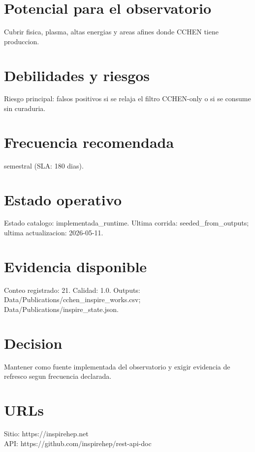 \documentclass[10pt,a4paper]{article}
\begin{document}
\section*{Potencial para el observatorio}
Cubrir fisica, plasma, altas energias y areas afines donde CCHEN tiene produccion.

\section*{Debilidades y riesgos}
Riesgo principal: falsos positivos si se relaja el filtro CCHEN-only o si se consume sin curaduria.

\section*{Frecuencia recomendada}
semestral (SLA: 180 dias).

\section*{Estado operativo}
Estado catalogo: implementada\_runtime. Ultima corrida: seeded\_from\_outputs; ultima actualizacion: 2026-05-11.

\section*{Evidencia disponible}
Conteo registrado: 21. Calidad: 1.0. Outputs: Data/Publications/cchen\_inspire\_works.csv; Data/Publications/inspire\_state.json.

\section*{Decision}
Mantener como fuente implementada del observatorio y exigir evidencia de refresco segun frecuencia declarada.


\section*{URLs}
Sitio: https://inspirehep.net\\
API: https://github.com/inspirehep/rest-api-doc
\end{document}
